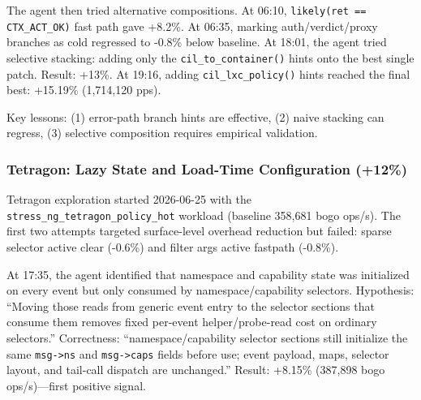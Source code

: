 \documentclass[sigplan,10pt,anonymous,nonacm]{acmart}
\begin{document}
The agent then tried alternative compositions. At 06:10, \texttt{likely(ret == CTX\_ACT\_OK)} fast path gave +8.2\%. At 06:35, marking auth/verdict/proxy branches as cold regressed to -0.8\% below baseline. At 18:01, the agent tried selective stacking: adding only the \texttt{cil\_to\_container()} hints onto the best single patch. Result: +13\%. At 19:16, adding \texttt{cil\_lxc\_policy()} hints reached the final best: +15.19\% (1,714,120 pps).

Key lessons: (1) error-path branch hints are effective, (2) naive stacking can regress, (3) selective composition requires empirical validation.

\subsubsection{Tetragon: Lazy State and Load-Time Configuration (+12\%)}

Tetragon exploration started 2026-06-25 with the \texttt{stress\_ng\_tetragon\_policy\_hot} workload (baseline 358,681 bogo ops/s). The first two attempts targeted surface-level overhead reduction but failed: sparse selector active clear (-0.6\%) and filter args active fastpath (-0.8\%).

At 17:35, the agent identified that namespace and capability state was initialized on every event but only consumed by namespace/capability selectors. Hypothesis: ``Moving those reads from generic event entry to the selector sections that consume them removes fixed per-event helper/probe-read cost on ordinary selectors.'' Correctness: ``namespace/capability selector sections still initialize the same \texttt{msg->ns} and \texttt{msg->caps} fields before use; event payload, maps, selector layout, and tail-call dispatch are unchanged.'' Result: +8.15\% (387,898 bogo ops/s)---first positive signal.
\end{document}
